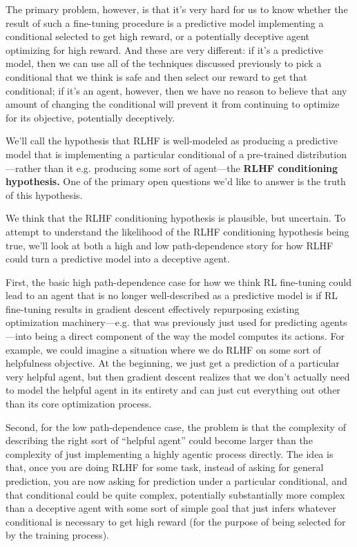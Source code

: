 {The primary problem, however, is that it's very hard for us to know whether the result of such a fine-tuning procedure is a predictive model implementing a conditional selected to get high reward, or a potentially deceptive agent optimizing for high reward. And these are very different: if it's a predictive model, then we can use all of the techniques discussed previously to pick a conditional that we think is safe and then select our reward to get that conditional; if it's an agent, however, then we have no reason to believe that any amount of changing the conditional will prevent it from continuing to optimize for its objective, potentially deceptively.

We'll call the hypothesis that RLHF is well-modeled as producing a predictive model that is implementing a particular conditional of a pre-trained distribution---rather than it e.g. producing some sort of agent---the \textbf{RLHF conditioning hypothesis.} One of the primary open questions we'd like to answer is the truth of this hypothesis.

We think that the RLHF conditioning hypothesis is plausible, but uncertain. To attempt to understand the likelihood of the RLHF conditioning hypothesis being true, we'll look at both a high and low path-dependence\cite{TODO: cite https://www.alignmentforum.org/posts/bxkWd6WdkPqGmdHEk/path-dependence-in-ml-inductive-biases} story for how RLHF could turn a predictive model into a deceptive agent.

First, the basic high path-dependence case for how we think RL fine-tuning could lead to an agent that is no longer well-described as a predictive model is if RL fine-tuning results in gradient descent effectively repurposing existing optimization machinery---e.g. that was previously just used for predicting agents---into being a direct component of the way the model computes its actions. For example, we could imagine a situation where we do RLHF on some sort of helpfulness objective\cite{TODO: cite https://arxiv.org/abs/2204.05862}. At the beginning, we just get a prediction of a particular very helpful agent, but then gradient descent realizes that we don't actually need to model the helpful agent in its entirety and can just cut everything out other than its core optimization process.

Second, for the low path-dependence case, the problem is that the complexity of describing the right sort of ``helpful agent'' could become larger than the complexity of just implementing a highly agentic process directly. The idea is that, once you are doing RLHF for some task, instead of asking for general prediction, you are now asking for prediction under a particular conditional, and that conditional could be quite complex, potentially substantially more complex than a deceptive agent with some sort of simple goal that just infers whatever conditional is necessary to get high reward (for the purpose of being selected for by the training process).

}
